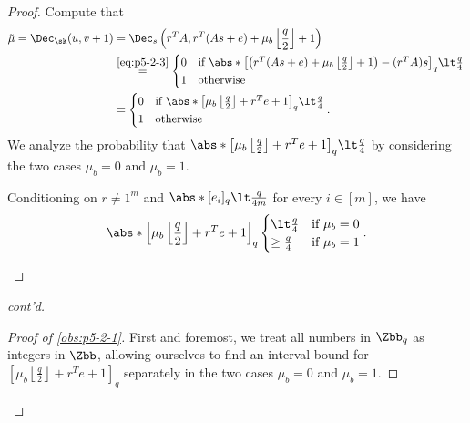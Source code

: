 \begin{answer}[ii]
\begin{proof}
    
        Compute that
        \begin{align}\label{eq:p5-2-5}
            \tilde{\mu}=\Dec_\sk(u, v+1)
            &=\Dec_s\left(r^T A, r^T (As+e)+\mu_b\left\lfloor \frac{q}{2}\right\rfloor+1\right)\notag\\
            &\stackrel{\eqref{eq:p5-2-3}}= \begin{cases}
                0 &\textrm{if } \abs*{\left[\left(r^T (As+e)+\mu_b\left\lfloor \frac{q}{2}\right\rfloor+1 \right) - (r^T A)s\right]_q}\lt \frac{q}{4}\\
                1 &\textrm{otherwise}
            \end{cases}\notag\\
            &=\begin{cases}
                0 &\textrm{if } \abs*{\left[\mu_b\left\lfloor \frac{q}{2}\right\rfloor +  r^T e + 1\right]_q}\lt \frac{q}{4}\\
                1 &\textrm{otherwise}
            \end{cases}.
        \end{align}
        We analyze the probability that $\abs*{\left[\mu_b\left\lfloor \frac{q}{2}\right\rfloor +  r^T e + 1\right]_q} \lt \frac{q}{4}$ by considering the two cases $\mu_b=0$ and $\mu_b=1$.

        \begin{observation}\label{obs:p5-2-1}
            Conditioning on $r\neq 1^m$ and $\abs*{[e_i]_q}\lt \frac{q}{4m}$ for every $i\in [m]$, we have
            \[
                \abs*{\left[\mu_b\left\lfloor \frac{q}{2}\right\rfloor+ r^Te+1 \right]_q}
                \begin{cases}
                    \lt \frac{q}{4} &\textrm{if } \mu_b=0\\
                    \ge  \frac{q}{4} &\textrm{if } \mu_b=1
                \end{cases}.
            \]
        \end{observation}


        \end{proof}\begin{proof}[cont'd]
        \leavevmode\par

        \begin{proof}[Proof of \autoref{obs:p5-2-1}]
            First and foremost, we treat all numbers in $\Zbb_q$ as integers in $\Zbb$, allowing ourselves to find an interval bound for $\left[\mu_b\left\lfloor \frac{q}{2}\right\rfloor+ r^Te+1\right]_q$ separately in the two cases $\mu_b=0$ and $\mu_b=1$.
        

\end{proof}
\end{proof}
\end{answer}
